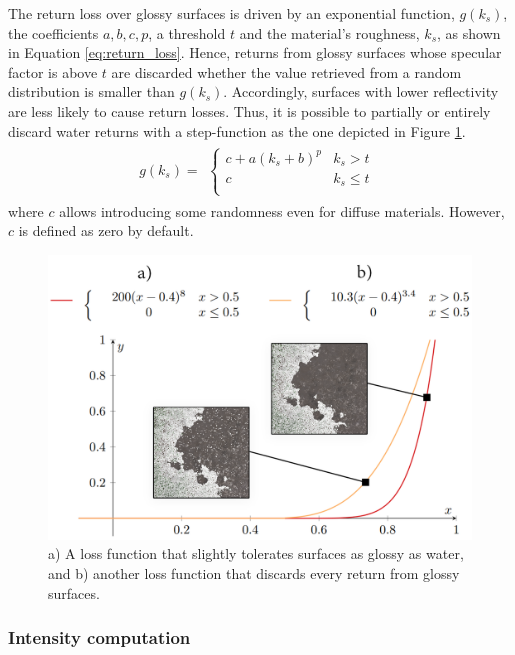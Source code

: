 The return loss over glossy surfaces is driven by an exponential function, $g(k_{s})$, the coefficients $a, b, c, p$, a threshold $\textit{t}$ and the material's roughness, $k_s$, as shown in Equation \ref{eq:return_loss}. Hence, returns from glossy surfaces whose specular factor is above $\textit{t}$ are discarded whether the value retrieved from a random distribution is smaller than $g(k_{s})$. Accordingly, surfaces with lower reflectivity are less likely to cause return losses. Thus, it is possible to partially or entirely discard water returns with a step-function as the one depicted in Figure \ref{fig:glossy_loss}. 
\begin{gather}
    \label{eq:return_loss}
    g(k_{s}) = \begin{aligned}
        \begin{cases}
            c + a (k_{s} + b) ^ {p} &k_{s} > \textit{t}\\
            c &k_{s} \leq \textit{t}\\
        \end{cases}
    \end{aligned}
\end{gather}
where $c$ allows introducing some randomness even for diffuse materials. However, $c$ is defined as zero by default.

\begin{figure}
	\centering
	\includegraphics[width=.9\linewidth]{figs/lidar_simulation/glossy_loss.png}
	\caption{a) A loss function that slightly tolerates surfaces as glossy as water, and b) another loss function that discards every return from glossy surfaces. }
	\label{fig:glossy_loss}
\end{figure}

\subsubsection{Intensity computation}

